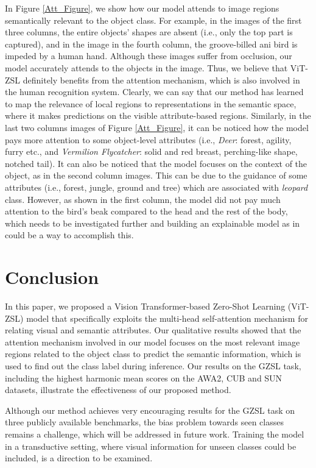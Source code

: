 \documentclass[a4paper,11pt]{article}
\newcommand{\myparagraph}[1]{\vspace{4pt}\noindent{\bf #1}}
\begin{document}
\myparagraph{Attention Maps:} In Figure \ref{Att_Figure}, we show how our model attends to image regions semantically relevant to the object class. For example, in the images of the first three columns, the entire objects' shapes are absent (i.e., only the top part is captured), and in the image in the fourth column, the groove-billed ani bird is impeded by a human hand. Although these images suffer from occlusion, our model accurately attends to the objects in the image. Thus, we believe that ViT-ZSL definitely benefits from the attention mechanism, which is also involved in the human recognition system. Clearly, we can say that our method has learned to map the relevance of local regions to representations in the semantic space, where it makes predictions on the visible attribute-based regions. Similarly, in the last two columns images of Figure \ref{Att_Figure}, it can be noticed how the model pays more attention to some object-level attributes (i.e., \textit{Deer}: forest, agility, furry etc., and \textit{Vermilion Flycatcher}: solid and red breast, perching-like shape, notched tail). It can also be noticed that the model focuses on the context of the object, as in the second column images. This can be due to the guidance of some attributes (i.e., forest, jungle, ground and tree) which are associated with \textit{leopard} class. However, as shown in the first column, the model did not pay much attention to the bird's beak compared to the head and the rest of the body, which needs to be investigated further and building an explainable model as in \cite{f-VAEGAN-D2} could be a way to accomplish this.

\section{Conclusion}
In this paper, we proposed a Vision Transformer-based Zero-Shot Learning (ViT-ZSL) model that specifically exploits the multi-head self-attention mechanism for relating visual and semantic attributes. Our qualitative results showed that the attention mechanism involved in our model focuses on the most relevant image regions related to the object class to predict the semantic information, which is used to find out the class label during inference. {Our results on the GZSL task, including the highest harmonic mean scores on the AWA2, CUB and SUN datasets, illustrate the effectiveness of our proposed method}.

Although our method achieves very encouraging results for the GZSL task on three publicly available benchmarks, the bias problem towards seen classes remains a challenge, which will be addressed in future work. Training the model in a transductive setting, where visual information for unseen classes could be included, is a direction to be examined.
\end{document}
